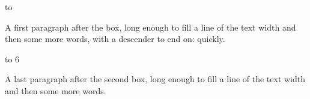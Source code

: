 \documentclass[11pt]{article}
\newlength\titlebox \setlength\titlebox{11\baselineskip}
\begin{document}
\vbox to 

A first paragraph after the box, long enough to fill a line of the text width
and then some more words, with a descender to end on: quickly.

\vbox to 6\baselineskip{\hsize\textwidth
 Text at the top of a second box.\par
 \vfil
 Text at the foot of the box, after its fil glue.\par}

A last paragraph after the second box, long enough to fill a line of the
text width and then some more words.
\end{document}
